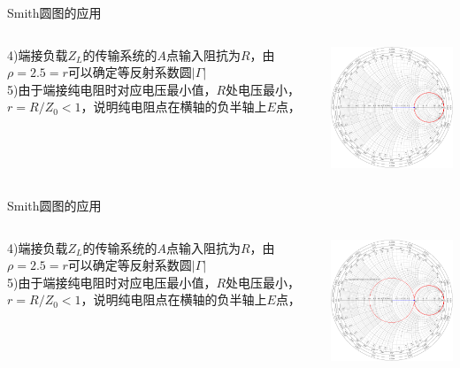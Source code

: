 \begin{frame}{Smith圆图的应用}
  \begin{columns}
    \begin{column}{0.4\linewidth}
      4)\quad 端接负载$Z_L$的传输系统的$A$点输入阻抗为$R$，由$\rho=2.5=r$可以确定等反射系数圆$\lvert\Gamma\rvert$\\
      5)\quad 由于端接纯电阻时对应电压最小值，$R$处电压最小，$r=R/Z_0<1$，说明纯电阻点在横轴的负半轴上$E$点，
    \end{column}
    \begin{column}{0.6\linewidth}
      \includegraphics[width=7cm]{fig4-17-4.pdf}
    \end{column}
  \end{columns}
\end{frame}

\begin{frame}{Smith圆图的应用}
  \begin{columns}
    \begin{column}{0.4\linewidth}
      4)\quad 端接负载$Z_L$的传输系统的$A$点输入阻抗为$R$，由$\rho=2.5=r$可以确定等反射系数圆$\lvert\Gamma\rvert$\\
      5)\quad 由于端接纯电阻时对应电压最小值，$R$处电压最小，$r=R/Z_0<1$，说明纯电阻点在横轴的负半轴上$E$点，
    \end{column}
    \begin{column}{0.6\linewidth}
      \includegraphics[width=7cm]{fig4-17-5.pdf}
    \end{column}
  \end{columns}
\end{frame}

